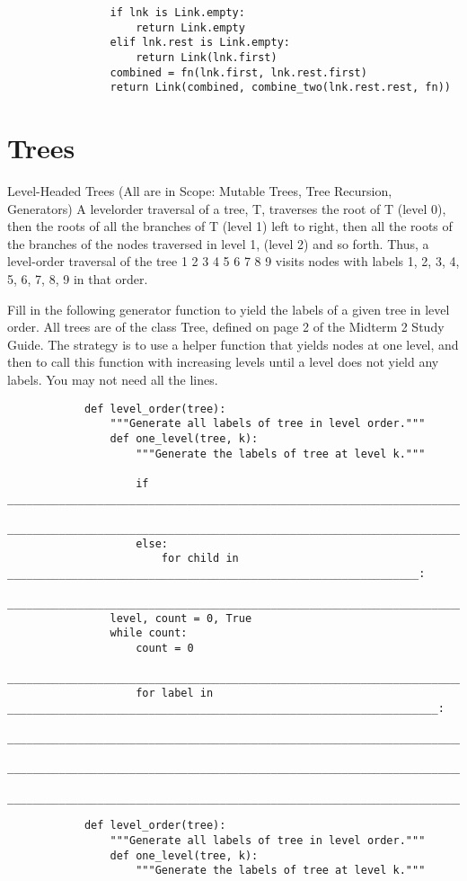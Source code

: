 \documentclass{exam}
\begin{document}
\begin{questions}
\begin{blocksection}
\begin{solution}
\begin{lstlisting}
				if lnk is Link.empty:
        			return Link.empty
    			elif lnk.rest is Link.empty:
        			return Link(lnk.first)
    			combined = fn(lnk.first, lnk.rest.first)
    			return Link(combined, combine_two(lnk.rest.rest, fn))
		\end{lstlisting}
	\end{solution}
\section{Trees}
	\begin{blocksection}
		Level-Headed Trees (All are in Scope: Mutable Trees, Tree Recursion, Generators) A levelorder traversal of a tree, T, traverses the root of T (level 0), then the roots of all the branches of T (level 1)
		left to right, then all the roots of the branches of the nodes traversed in level 1, (level 2) and so forth. Thus, a
		level-order traversal of the tree
									1
								2   3   4
							5 	6	7	8	9
		visits nodes with labels 1, 2, 3, 4, 5, 6, 7, 8, 9 in that order.
		
		Fill in the following generator function to yield the labels of a given tree in level order. All trees are
		of the class Tree, defined on page 2 of the Midterm 2 Study Guide. The strategy is to use a helper function
		that yields nodes at one level, and then to call this function with increasing levels until a level does not yield
		any labels. You may not need all the lines.
		\begin{lstlisting}
			def level_order(tree):
				"""Generate all labels of tree in level order."""
				def one_level(tree, k):
					"""Generate the labels of tree at level k."""
					
					if _____________________________________________________________________________:
						_____________________________________________________________________________
					else:
						for child in ________________________________________________________________:
							_________________________________________________________________________
				level, count = 0, True
				while count:
					count = 0
					________________________________________________________________________________
					for label in ___________________________________________________________________:
						____________________________________________________________________________
						____________________________________________________________________________
					________________________________________________________________________________
		\end{lstlisting}
	\end{blocksection}
	\begin{solution}
		\begin{lstlisting}
			def level_order(tree):
				"""Generate all labels of tree in level order."""
				def one_level(tree, k):
					"""Generate the labels of tree at level k."""
						

\end{lstlisting}
\end{solution}
\end{blocksection}
\end{questions}
\end{document}
